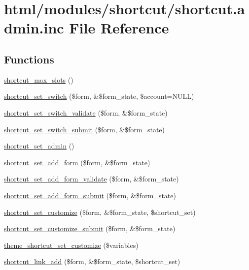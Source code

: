 \hypertarget{shortcut_8admin_8inc}{
\section{html/modules/shortcut/shortcut.admin.inc File Reference}
\label{shortcut_8admin_8inc}
}
\subsection*{Functions}
\begin{DoxyCompactItemize}
\item 
\hyperlink{shortcut_8admin_8inc_a4bb1c6aac5c6c40537b3add69ccd543d}{shortcut\_\-max\_\-slots} ()
\item 
\hyperlink{group__forms_ga9ec510e2dad9820993309247e6a50bd7}{shortcut\_\-set\_\-switch} (\$form, \&\$form\_\-state, \$account=NULL)
\item 
\hyperlink{shortcut_8admin_8inc_ad9a4a7bd86add86452fdae0d123704a5}{shortcut\_\-set\_\-switch\_\-validate} (\$form, \&\$form\_\-state)
\item 
\hyperlink{shortcut_8admin_8inc_a0fbc329e8a567e9364a54e57ce31ee04}{shortcut\_\-set\_\-switch\_\-submit} (\$form, \&\$form\_\-state)
\item 
\hyperlink{shortcut_8admin_8inc_aca3f7ce7ccc572bccbfc8c130ac27151}{shortcut\_\-set\_\-admin} ()
\item 
\hyperlink{group__forms_ga7c3cd4fdbb8948463aab7769fc5e07b8}{shortcut\_\-set\_\-add\_\-form} (\$form, \&\$form\_\-state)
\item 
\hyperlink{shortcut_8admin_8inc_a7148e2c08e32e220522d92a113b63f0e}{shortcut\_\-set\_\-add\_\-form\_\-validate} (\$form, \&\$form\_\-state)
\item 
\hyperlink{shortcut_8admin_8inc_ad472e8cf443ae585c10ba86a12d7147b}{shortcut\_\-set\_\-add\_\-form\_\-submit} (\$form, \&\$form\_\-state)
\item 
\hyperlink{group__forms_ga6d25a8f35b26a475dc005c2cad4d902c}{shortcut\_\-set\_\-customize} (\$form, \&\$form\_\-state, \$shortcut\_\-set)
\item 
\hyperlink{shortcut_8admin_8inc_a913f637b897f5261c040b4d66f9448ff}{shortcut\_\-set\_\-customize\_\-submit} (\$form, \&\$form\_\-state)
\item 
\hyperlink{group__themeable_ga09ee7cf1498bdf9d44c787179a9c24c8}{theme\_\-shortcut\_\-set\_\-customize} (\$variables)
\item 
\hyperlink{group__forms_ga7d6281f92a029c89b4e72756e5f44859}{shortcut\_\-link\_\-add} (\$form, \&\$form\_\-state, \$shortcut\_\-set)

\end{DoxyCompactItemize}
